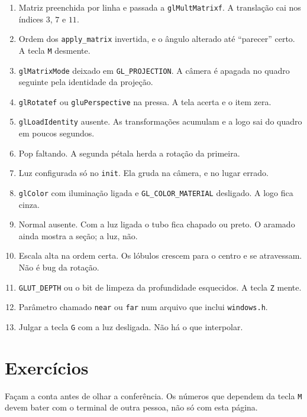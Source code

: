 \documentclass[11pt,a4paper]{article}
\newcommand{\fn}[1]{\texttt{\nobreak\hspace{0pt}#1}}
\begin{document}
\begin{enumerate}
\item Matriz preenchida por linha e passada a \fn{glMultMatrixf}. A translação cai nos índices \(3\), \(7\) e \(11\).
\item Ordem dos \fn{apply\_matrix} invertida, e o ângulo alterado até ``parecer'' certo. A tecla \fn{M} desmente.
\item \fn{glMatrixMode} deixado em \fn{GL\_PROJECTION}. A câmera é apagada no quadro seguinte pela identidade da projeção.
\item \fn{glRotatef} ou \fn{gluPerspective} na pressa. A tela acerta e o item zera.
\item \fn{glLoadIdentity} ausente. As transformações acumulam e a logo sai do quadro em poucos segundos.
\item Pop faltando. A segunda pétala herda a rotação da primeira.
\item Luz configurada só no \fn{init}. Ela gruda na câmera, e no lugar errado.
\item \fn{glColor} com iluminação ligada e \fn{GL\_COLOR\_MATERIAL} desligado. A logo fica cinza.
\item Normal ausente. Com a luz ligada o tubo fica chapado ou preto. O aramado ainda mostra a seção; a luz, não.
\item Escala alta na ordem certa. Os lóbulos crescem para o centro e se atravessam. Não é bug da rotação.
\item \fn{GLUT\_DEPTH} ou o bit de limpeza da profundidade esquecidos. A tecla \fn{Z} mente.
\item Parâmetro chamado \fn{near} ou \fn{far} num arquivo que inclui \fn{windows.h}.
\item Julgar a tecla \fn{G} com a luz desligada. Não há o que interpolar.
\end{enumerate}

\section{Exercícios}
\label{sec:ex}

Façam a conta antes de olhar a conferência. Os números que dependem da tecla \fn{M} devem bater com o terminal de outra pessoa, não só com esta página.
\end{document}
